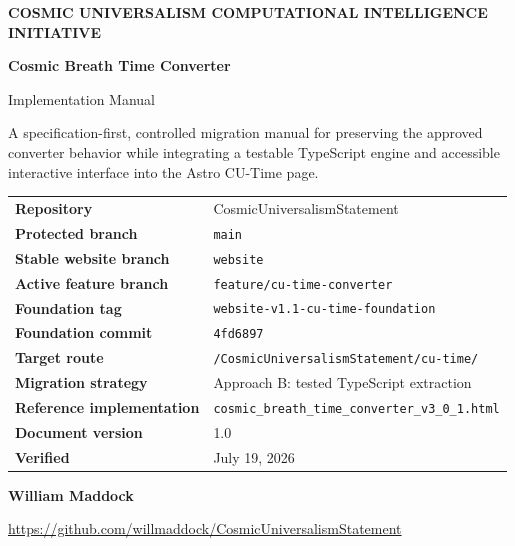 \documentclass[11pt,letterpaper]{article}
\newcommand{\ProjectTitle}{Cosmic Breath Time Converter}
\newcommand{\DocumentTitle}{Implementation Manual}
\newcommand{\RepositoryName}{CosmicUniversalismStatement}
\newcommand{\RepositoryURL}{https://github.com/willmaddock/CosmicUniversalismStatement}
\newcommand{\StableBranch}{website}
\newcommand{\WebsiteBranch}{feature/cu-time-converter}
\newcommand{\TargetRoute}{/CosmicUniversalismStatement/cu-time/}
\newcommand{\BaselineTag}{website-v1.1-cu-time-foundation}
\newcommand{\BaselineCommit}{4fd6897}
\newcommand{\DocumentVersion}{1.0}
\newcommand{\VerificationDate}{July 19, 2026}
\newcommand{\AuthorName}{William Maddock}
\begin{document}
\begin{titlepage}
\pagecolor{CUNavy}
\color{white}
\thispagestyle{empty}

\vspace*{0.65in}

{\small\bfseries\color{CUCyanLight}
COSMIC UNIVERSALISM COMPUTATIONAL INTELLIGENCE INITIATIVE}

\vspace{0.42in}

{\Huge\bfseries
\ProjectTitle}

\vspace{0.18in}

{\LARGE\color{CUGoldLight}
\DocumentTitle}

\vspace{0.32in}

{\large
A specification-first, controlled migration manual for preserving the
approved converter behavior while integrating a testable TypeScript engine
and accessible interactive interface into the Astro CU-Time page.}

\vfill

\begin{tcolorbox}[
    colback=CUNavyTwo,
    colframe=CUBlue,
    boxrule=0.8pt,
    arc=2mm,
    width=\textwidth
]
\color{white}
\begin{tabularx}{\textwidth}{>{\bfseries}L{1.72in}Y}
Repository & \RepositoryName \\
Protected branch & \texttt{main} \\
Stable website branch & \texttt{\StableBranch} \\
Active feature branch & \texttt{\WebsiteBranch} \\
Foundation tag & \texttt{\BaselineTag} \\
Foundation commit & \texttt{\BaselineCommit} \\
Target route & \texttt{\TargetRoute} \\
Migration strategy & Approach B: tested TypeScript extraction \\
Reference implementation & \texttt{cosmic\_breath\_time\_converter\_v3\_0\_1.html} \\
Document version & \DocumentVersion \\
Verified & \VerificationDate \\
\end{tabularx}
\end{tcolorbox}

\vfill

{\large\bfseries \AuthorName}

\vspace{0.1in}

{\small \href{\RepositoryURL}{\RepositoryURL}}

\vspace{0.4in}

\end{titlepage}
\end{document}
